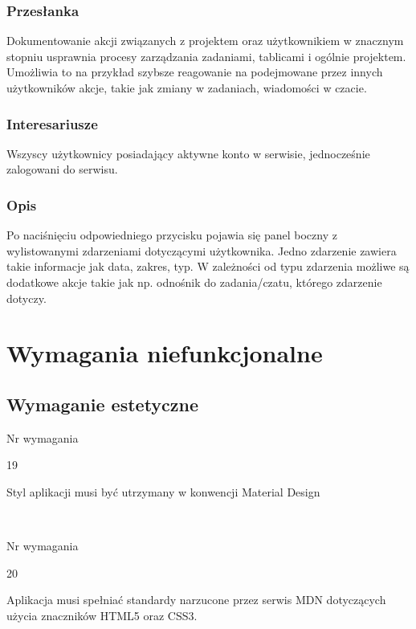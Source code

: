 \documentclass[eng,printmode]{mgr}
\begin{document}
\subsubsection{Przesłanka}
Dokumentowanie akcji związanych z projektem oraz użytkownikiem w znacznym stopniu usprawnia procesy zarządzania zadaniami, tablicami i ogólnie projektem. Umożliwia to na przykład szybsze reagowanie na podejmowane przez innych użytkowników akcje, takie jak zmiany w zadaniach, wiadomości w czacie.

\subsubsection{Interesariusze}
Wszyscy użytkownicy posiadający aktywne konto w serwisie, jednocześnie zalogowani do serwisu.

\subsubsection{Opis}
Po naciśnięciu odpowiedniego przycisku pojawia się panel boczny z wylistowanymi zdarzeniami dotyczącymi użytkownika. Jedno zdarzenie zawiera takie informacje jak data, zakres, typ. W zależności od typu zdarzenia możliwe są dodatkowe akcje takie jak np. odnośnik do zadania/czatu, którego zdarzenie dotyczy.

\section{Wymagania niefunkcjonalne}
\subsection{Wymaganie estetyczne}
\begin{labeling}{Nr wymagania}
 \item [\textbf{Nr wymagania}:] 19
 \item [\textbf{Treść}:] Styl aplikacji musi być utrzymany w konwencji Material Design \cite{Material}
\end{labeling} \ \\

\begin{labeling}{Nr wymagania}
 \item [\textbf{Nr wymagania}:] 20
 \item [\textbf{Treść}:] Aplikacja musi spełniać standardy narzucone przez serwis MDN \cite{MDN_HTML}\cite{MDN_CSS} dotyczących użycia znaczników HTML5 oraz CSS3.
\end{labeling} \ \\
\end{document}
